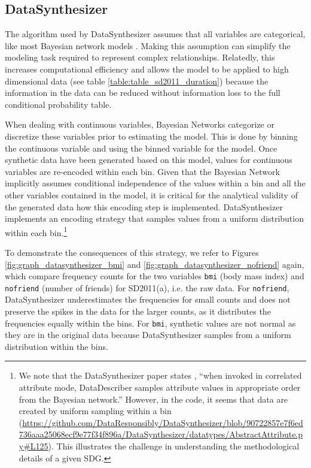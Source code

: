 \documentclass[runningheads]{llncs}
\begin{document}
\subsection{DataSynthesizer}\label{subsec:know_your_generator_datasynthesizer}

The algorithm used by DataSynthesizer assumes that all variables are categorical, like most Bayesian network models \cite{young2009using}.  Making this assumption can simplify the modeling task required to represent complex relationships.  Relatedly, this increases computational efficiency and allows the model to be applied to high dimensional data (see table \ref{table:table_sd2011_duration}) because the information in the data can be reduced without information loss to the full conditional probability table. 

When dealing with continuous variables, Bayesian Networks categorize or discretize these variables prior to estimating the model.  This is done by binning the continuous variable and using the binned variable  for the model.  Once synthetic data have been generated based on this model, values for continuous variables are re-encoded within each bin. Given that the Bayesian Network implicitly assumes conditional independence of the values within a bin and all the other variables contained in the model, it is critical for the analytical validity of the generated data how this encoding step is implemented. DataSynthesizer implements an encoding strategy that samples values from a uniform distribution  within each bin.\footnote{We note that the DataSynthesizer paper states \cite{ping2017datasynthesizer}, ``when invoked in correlated attribute mode, DataDescriber samples attribute values in appropriate order from the Bayesian network.''  However, in the code, it seems that data are created by uniform sampling within a bin (\url{https://github.com/DataResponsibly/DataSynthesizer/blob/90722857e7f6ed736aaa25068ecf9e77f34f896a/DataSynthesizer/datatypes/AbstractAttribute.py\#L125}).  This illustrates the challenge in understanding the methodological details of a given SDG.}  

To demonstrate the consequences of this strategy, we refer to Figures \ref{fig:graph_datasynthesizer_bmi} and \ref{fig:graph_datasynthesizer_nofriend} again, which compare frequency counts for the two variables \texttt{bmi} (body mass index) and  \texttt{nofriend} (number of friends) for SD2011(a), i.e. the raw data.  For  \texttt{nofriend}, DataSynthesizer underestimates the frequencies for small counts and does not preserve the spikes in the data for the larger counts, as it distributes the frequencies equally within the bins. For \texttt{bmi}, synthetic values are not normal as they are in the original data because DataSynthesizer samples from a uniform distribution within the bins.   
\end{document}
